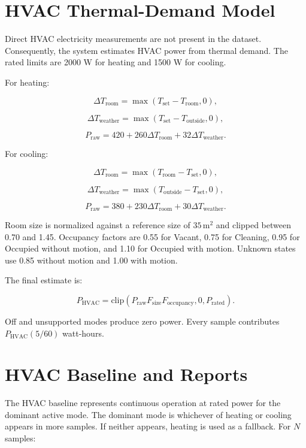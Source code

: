 \section{HVAC Thermal-Demand Model}

Direct HVAC electricity measurements are not present in the dataset.
Consequently, the system estimates HVAC power from thermal demand. The rated
limits are 2000 W for heating and 1500 W for cooling.

For heating:

\[
    \Delta T_{\mathrm{room}} =
    \max(T_{\mathrm{set}}-T_{\mathrm{room}},0),
\]

\[
    \Delta T_{\mathrm{weather}} =
    \max(T_{\mathrm{set}}-T_{\mathrm{outside}},0),
\]

\[
    P_{\mathrm{raw}} =
    420 + 260\Delta T_{\mathrm{room}}
    + 32\Delta T_{\mathrm{weather}}.
\]

For cooling:

\[
    \Delta T_{\mathrm{room}} =
    \max(T_{\mathrm{room}}-T_{\mathrm{set}},0),
\]

\[
    \Delta T_{\mathrm{weather}} =
    \max(T_{\mathrm{outside}}-T_{\mathrm{set}},0),
\]

\[
    P_{\mathrm{raw}} =
    380 + 230\Delta T_{\mathrm{room}}
    + 30\Delta T_{\mathrm{weather}}.
\]

Room size is normalized against a reference size of $35\,\mathrm{m}^2$ and
clipped between 0.70 and 1.45. Occupancy factors are 0.55 for Vacant, 0.75 for
Cleaning, 0.95 for Occupied without motion, and 1.10 for Occupied with motion.
Unknown states use 0.85 without motion and 1.00 with motion.

The final estimate is:

\[
    P_{\mathrm{HVAC}} =
    \mathrm{clip}
    \left(P_{\mathrm{raw}}F_{\mathrm{size}}F_{\mathrm{occupancy}},
    0,P_{\mathrm{rated}}\right).
\]

Off and unsupported modes produce zero power. Every sample contributes
$P_{\mathrm{HVAC}}(5/60)$ watt-hours.

\section{HVAC Baseline and Reports}

The HVAC baseline represents continuous operation at rated power for the
dominant active mode. The dominant mode is whichever of heating or cooling
appears in more samples. If neither appears, heating is used as a fallback.
For $N$ samples:

